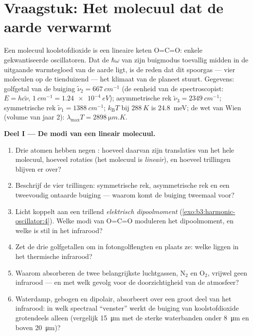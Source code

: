 \section{Vraagstuk: Het molecuul dat de aarde verwarmt}

\begin{problem}\label{pb:b3:harmonic-oscillator:1}
Een molecuul koolstofdioxide is een lineaire keten O=C=O: enkele
gekwantiseerde oscillatoren. Dat de $\hbar\omega$ van zijn buigmodus
toevallig midden in de uitgaande warmtegloed van de aarde ligt, is de
reden dat dit spoorgas --- vier moleculen op de tienduizend --- het
klimaat van de planeet stuurt. Gegevens: golfgetal van de buiging
$\tilde\nu_2 = \qty{667}{cm^{-1}}$ (de eenheid van de spectroscopist: $E = hc\tilde\nu$, $\qty{1}{cm^{-1}} =
\qty{1.24e-4}{eV}$); asymmetrische rek
$\tilde\nu_3 =
\qty{2349}{cm^{-1}}$; symmetrische rek $\tilde\nu_1 =
\qty{1388}{cm^{-1}}$; $k_{\text{B}}T$ bij $\qty{288}{K}$ is
\qty{24.8}{meV}; de wet van Wien (volume van jaar 2): $\lambda_{\max}T =
\qty{2898}{\micro m.K}$.

\medskip\noindent\textbf{Deel I --- De modi van een lineair molecuul.}
\begin{enumerate}
  \item Drie atomen hebben negen : hoeveel daarvan zijn
        translaties van het hele molecuul, hoeveel rotaties (het molecuul
        is \emph{lineair}), en hoeveel trillingen blijven er over?
  \item Beschrijf de vier trillingen: symmetrische rek, asymmetrische rek
        en een tweevoudig ontaarde buiging --- waarom komt de buiging
        tweemaal voor?
  \item Licht koppelt aan een trillend \emph{elektrisch dipoolmoment}
        (\cref{exo:b3:harmonic-oscillator:4}). Welke modi van O=C=O
        moduleren het dipoolmoment, en welke is stil in het infrarood?
  \item Zet de drie golfgetallen om in fotongolflengten en plaats ze:
        welke liggen in het thermische infrarood?
  \item Waarom absorberen de twee belangrijkste luchtgassen, N$_2$ en
        O$_2$, vrijwel geen infrarood --- en met welk gevolg voor de
        doorzichtigheid van de atmosfeer?
  \item Waterdamp, gebogen en dipolair, absorbeert over een groot deel van
        het infrarood: in welk spectraal ``venster'' werkt de buiging van
        koolstofdioxide grotendeels alleen (vergelijk \qty{15}{\micro m}
        met de sterke waterbanden onder \qty{8}{\micro m} en boven
        \qty{20}{\micro m})?
\end{enumerate}


\end{problem}
